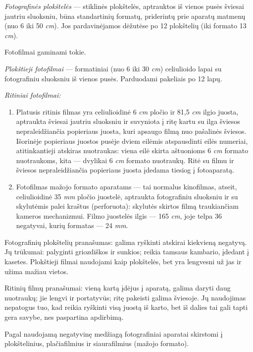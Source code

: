 \documentclass[12pt]{book}
\begin{document}
					\textit{Fotografinės plokštelės} --- stiklinės plokštelės, aptrauktos iš vienos pusės šviesai jautriu sluoksniu, būna standartinių formatų, priderintų prie aparatų matmenų (nuo 6  iki 50  \textit{cm}). Jos pardavinėjamos dėžutėse po 12 plokštelių (iki formato 13  \textit{cm}).

					Fotofilmai gaminami tokie.

					\textit{Plokštieji fotofilmai} --- formatiniai (nuo 6  iki 30  \textit{cm}) celiulioido lapai su fotografiniu sluoksniu iš vienos pusės. Parduodami pakeliais po 12 lapų.

					\textit{Ritiniai fotofilmai:}
					\begin{enumerate}
						\item Platusis ritinis filmas yra celiulioidinė 6 \textit{cm} pločio ir 81,5 \textit{cm} ilgio juosta, aptraukta šviesai jautriu sluoksniu ir suvyniota į ritę kartu su ilga šviesos nepraleidžiančia popieriaus juosta, kuri apsaugo filmą nuo pašalinės šviesos. Išorinėje popieriaus juostos pusėje dviem eilėmis atspausdinti eilės numeriai, atitinkantieji atskiras nuotraukas: viena eilė skirta aštuonioms 6  \textit{cm} formato nuotraukoms, kita --- dvylikai 6  \textit{cm} formato nuotraukų. Ritė su filmu ir šviesos nepraleidžiančia popieriaus juosta įdedama tiesiog į fotoaparatą.
						\item Fotofilmas mažojo formato aparatams --- tai normalus kinofilmas, atseit, celiulioidinė 35 \textit{mm} pločio juostelė, aptraukta fotografiniu sluoksniu ir su skylutėmis palei kraštus (perforuota): skylutės skirtos filmą traukiančiam kameros mechanizmui. Filmo juostelės ilgis --- 165 \textit{cm}, joje telpa 36 negatyvai, kurių formatas --- 24  \textit{mm}.
					\end{enumerate}

					Fotografinių plokštelių pranašumas: galima ryškinti atskirai kiekvieną negatyvą. Jų trūkumai: palyginti griozdiškos ir sunkios; reikia tamsaus kambario, įdedant į kasetes. Plokštieji filmai naudojami kaip plokštelės, bet yra lengvesni už jas ir užima mažiau vietos.

					Ritinių filmų pranašumai: vieną kartą įdėjus į aparatą, galima daryti daug nuotraukų; jie lengvi ir portatyvūs; ritę pakeisti galima šviesoje. Jų naudojimas nepatogus tuo, kad reikia ryškinti visą juostą iš karto, bet iš dalies tai gali tapti gera savybe, nes paspartina apdirbimą.

					Pagal naudojamą negatyvinę medžiagą fotografiniai aparatai skirstomi į plokštelinius, plačiafilmius ir siaurafilmius (mažojo formato).
\end{document}
